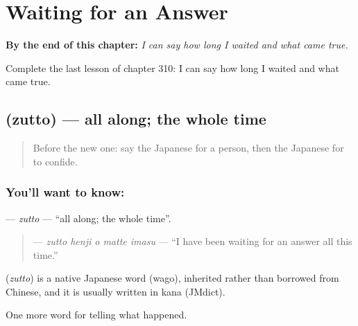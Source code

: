 
\chapter{Waiting for an Answer}
\label{ch:ja-waiting-for-an-answer}

\begin{chapteropening}
\textbf{By the end of this chapter:} \emph{I can say how long I waited and what came true.}

Complete the last lesson of chapter 310: I can say how long I waited and what came true.
\end{chapteropening}

\section[\texorpdfstring{\ja{ずっと} (zutto)}{ずっと (zutto)}]{ (zutto) — all along; the whole time}

\label{lesson:JA-C310-zutto}



\begin{quote}
Before the new one: say the Japanese for a person, then the Japanese for to confide.
\end{quote}

\subsection*{You'll want to know: }
\textbf{} — \emph{zutto} — \textquotedblleft{}all along; the whole time\textquotedblright{}.

\begin{quote}
\textbf{  } — \emph{zutto henji o matte imasu} — \textquotedblleft{}I have been waiting for an answer all this time.\textquotedblright{}
\end{quote}

\begin{cousinweb}
\textbf{} (\emph{zutto}) is a native Japanese word (wago), inherited rather than borrowed from Chinese, and it is usually written in kana (JMdict).
\end{cousinweb}

\begin{grammarlens}[title={What you've built}]
One more word for telling what happened.
\end{grammarlens}

